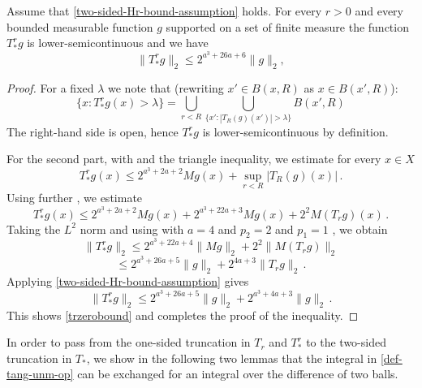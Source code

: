 \begin{lemma}\label{simple-nontangential-operator}
\leanok
{}
Assume that \eqref{two-sided-Hr-bound-assumption} holds.
For every $r>0$ and every bounded measurable function $g$ supported on a set of finite measure
the function $T_{*}^r g$ is lower-semicontinuous and we have
\begin{equation}\label{trzerobound}
    \|T_{*}^rg\|_2\le 2^{a^3+26a+6}\|g\|_2,
\end{equation}
\end{lemma}
\begin{proof}
\leanok
For a fixed $\lambda$ we note that (rewriting $x'\in B(x,R)$ as $x\in B(x',R)$):
\begin{equation}
    \{x : T_{*}^r g(x) > \lambda\} = \bigcup_{r<R}\bigcup_{\{x':|T_R(g)(x')|>\lambda\}} B(x',R)
\end{equation}
The right-hand side is open, hence $T_{*}^r g$ is lower-semicontinuous by definition.

For the second part, with  and the triangle inequality, we estimate for every $x\in X$
\begin{equation}
     T_{*}^r g(x)
     \le 2^{a^3 + 2a + 2} Mg(x)+\sup_{r<R} |T_R(g)(x)|\, .
\end{equation}
Using further , we estimate
\begin{equation}
      T_{*}^r g(x)
     \le 2^{a^3+2a+2}Mg(x) + 2^{a^3+22a+3}Mg(x) + 2^{2}M(T_rg)(x)\, .
\end{equation}
Taking the $L^2$ norm and using  with $a=4$  and $p_2=2$ and $p_1=1$ , we obtain
\begin{equation}
      \|T_{*}^r g\|_2
     \le 2^{a^3+22a+4} \|Mg\|_2 + 2^{2}\|M(T_rg)\|_2
\end{equation}
\begin{equation}
     \le 2^{a^3+26a+5} \|g\|_2 + 2^{4a+3}\|T_r g\|_2\, .
\end{equation}
Applying \eqref{two-sided-Hr-bound-assumption} gives
\begin{equation}
      \|T_{*}^r g\|_2\le 2^{a^3+26a+5}\|g\|_2 + 2^{a^3+4a+3}\|g\|_2\, .
\end{equation}
This shows \eqref{trzerobound} and completes the proof of the inequality.
\end{proof}
In order to pass from the one-sided truncation in $T_r$ and $T_{*}^r$ to the two-sided truncation in $T_*$, we show in the following two lemmas that the integral in \eqref{def-tang-unm-op} can be exchanged for an integral over the difference of two balls.
